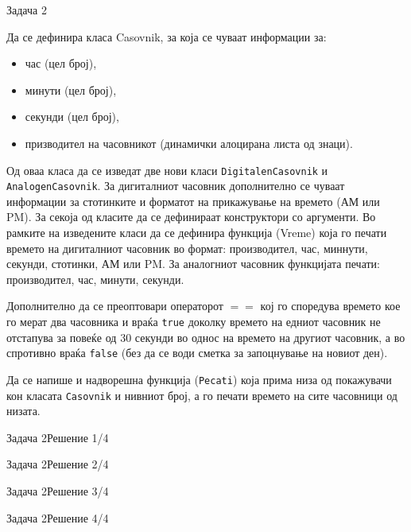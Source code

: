 \begin{frame}{Задача 2}
\begin{scriptsize}
Да се дефинира класа Casovnik, за која се чуваат информации за:
\begin{itemize}
  \item час (цел број),
  \item минути (цел број),
  \item секунди (цел број),
  \item призводител на часовникот (динамички алоцирана листа од знаци).
\end{itemize}
Од оваа класа да се изведат две нови класи \texttt{DigitalenCasovnik} и \texttt{AnalogenCasovnik}.
За дигиталниот часовник дополнително се чуваат информации за стотинките и
форматот на прикажување на времето (АМ или PM). За секоја од класите да се
дефинираат конструктори со аргументи. Во рамките на изведените класи да се
дефинира функција (Vreme) која го печати времето на дигиталниот часовник во
формат: производител, час, миннути, секунди, стотинки, АМ или PM. 
За аналогниот часовник функцијата печати: производител, час, минути, секунди.

Дополнително да се преоптовари операторот $==$ кој го споредува времето кое го
мерат два часовника и враќа \texttt{true} доколку времето на едниот часовник не
отстапува за повеќе од 30 секунди во однос на времето на другиот часовник, а во
спротивно враќа \texttt{false} (без да се води сметка за запоцнување на новиот
ден). 

Да се напише и надворешна функција (\texttt{Pecati}) која прима низа од
покажувачи кон класата \texttt{Casovnik} и нивниот број, а го печати времето на сите
часовници од низата.

\end{scriptsize}
\end{frame}

\begin{frame}[fragile]{Задача 2}{Решение 1/4}

\end{frame}
\begin{frame}[fragile]{Задача 2}{Решение 2/4}

\end{frame}
\begin{frame}[fragile]{Задача 2}{Решение 3/4}

\end{frame}
\begin{frame}[fragile]{Задача 2}{Решение 4/4}

\end{frame}


